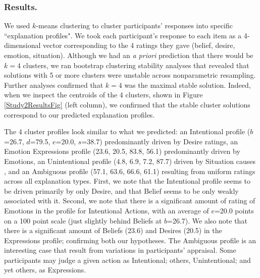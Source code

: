 \documentclass[10pt,letterpaper]{article}
\begin{document}
\subsubsection{Results.} 
We used $k$-means clustering to cluster participants' responses into specific ``explanation profiles". We took each participant's response to each item as a 4-dimensional vector corresponding to the 4 ratings they gave (belief, desire, emotion, situation). Although we had an \textit{a priori} prediction that there would be $k=4$ clusters, we ran bootstrap clustering stability analyses \cite{Hennig2007} that revealed that solutions with 5 or more clusters were unstable across nonparametric resampling. Further analyses confirmed that $k=4$ was the maximal stable solution. Indeed, when we inspect the centroids of the 4 clusters, shown in Figure \ref{Study2ResultsFig} (left column), we confirmed that the stable cluster solutions correspond to our predicted explanation profiles.






The 4 cluster profiles look similar to what we predicted: an Intentional profile ($b$=26.7, $d$=79.5, $e$=20.0, $s$=38.7) predominantly driven by Desire ratings, an Emotion Expressions profile (23.6, 20.5, 83.8, 56.1) predominantly driven by Emotions, an Unintentional profile (4.8, 6.9, 7.2, 87.7) driven by Situation causes , and an Ambiguous profile (57.1, 63.6, 66.6, 61.1) resulting from uniform ratings across all explanation types. First, we note that the Intentional profile seems to be driven primarily by only Desire, and that Belief seems to be only weakly associated with it. Second, we note that there is a significant amount of rating of Emotions in the profile for Intentional Actions, with an average of $e$=20.0 points on a 100 point scale (just slightly behind Beliefs at $b$=26.7). We also note that there is a significant amount of Beliefs (23.6) and Desires (20.5) in the Expressions profile; confirming both our hypotheses. 
The Ambiguous profile is an interesting case that result from variations in participants' appraisal. Some participants may judge a given action as Intentional; others, Unintentional; and yet others, as Expressions. %
\end{document}
